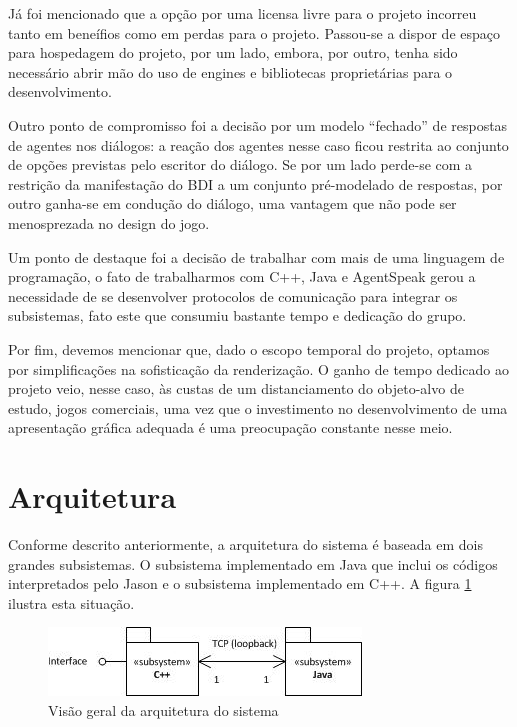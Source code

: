 Já foi mencionado que a opção por uma licensa livre para o projeto incorreu tanto em beneífios como em perdas para o projeto. Passou-se a dispor de espaço para hospedagem do projeto, por um lado, embora, por outro, tenha sido necessário abrir mão do uso de engines e bibliotecas proprietárias para o desenvolvimento.

Outro ponto de compromisso foi a decisão por um modelo ``fechado'' de respostas de agentes nos diálogos: a reação dos agentes nesse caso ficou restrita ao conjunto de opções previstas pelo escritor do diálogo. Se por um lado perde-se com a restrição da manifestação do BDI a um conjunto pré-modelado de respostas, por outro ganha-se em condução do diálogo, uma vantagem que não pode ser menosprezada no design do jogo.

Um ponto de destaque foi a decisão de trabalhar com mais de uma linguagem de programação, o fato de trabalharmos com C++, Java e AgentSpeak gerou a necessidade de se desenvolver protocolos de comunicação para integrar os subsistemas, fato este que consumiu bastante tempo e dedicação do grupo.

Por fim, devemos mencionar que, dado o escopo temporal do projeto, optamos por simplificações na sofisticação da renderização. O ganho de tempo dedicado ao projeto veio, nesse caso, às custas de um distanciamento do objeto-alvo de estudo, jogos comerciais, uma vez que o investimento no desenvolvimento de uma apresentação gráfica adequada é uma preocupação constante nesse meio.

\section{Arquitetura}

Conforme descrito anteriormente, a arquitetura do sistema é baseada em dois grandes subsistemas. O subsistema implementado em Java que inclui os códigos interpretados pelo Jason e o subsistema implementado em C++. A figura \ref{arquiteturaGeral} ilustra esta situação.

\begin{figure}
\centering
\includegraphics{figuras/arquitetura.jpg}
\caption{Visão geral da arquitetura do sistema}
\label{arquiteturaGeral}
\end{figure}


